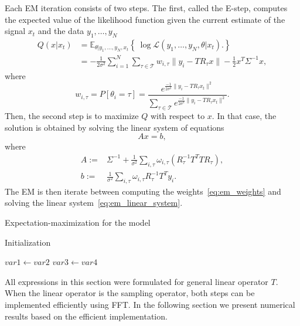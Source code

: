 \documentclass[english,12pt]{article}
\newcommand{\E}{\mathbb{E}}
\numberwithin{equation}{section}
\numberwithin{thm}{section} %
\begin{document}
Each EM iteration consists of two steps.
The first, called the E-step, computes the expected value of the likelihood function  given the current estimate of the signal $x_t$ and the data $y_1,\ldots,y_N$
\begin{equation}
\begin{split}
Q(x|x_t) &= \E_{\theta|y_1,\ldots,y_N,x_t}\left\{\ \log \mathcal{L}(y_1,\ldots,y_N,\theta|x_t).   \right\} \\
& = -\frac{1}{2\sigma^2}\sum_{i=1}^{N}\sum_{\tau\in\mathcal{T}}w_{i,\tau}\|y_i - TR_{\tau}x\| - \frac{1}{2}x^T\Sigma^{-1}x,
\end{split}
\end{equation} 
where 
\begin{equation} \label{eq:em_weights}
w_{i,\tau} = P[\theta_i = \tau] = \frac{e^{\frac{-1}{2\sigma^2}\|y_i-TR_\tau x_t\|^2 }}{\sum_{\tau\in\mathcal{T}}e^{\frac{-1}{2\sigma^2}\|y_i-TR_\tau x_t\|^2 }}.
\end{equation}
Then,  the second step is to maximize $Q$ with respect to $x$. In that case, the solution is obtained by solving the linear system of equations
\begin{equation} \label{eq:em_linear_system}
Ax = b,
\end{equation}
where 
\begin{align}
A :=&  \Sigma^{-1} + \frac{1}{\sigma^2}\sum_{i,\tau}\omega_{i,\tau} (R_\tau^{-1}T^TTR_\tau),\\ 
b :=&   \frac{1}{\sigma^2} \sum_{i,\tau}\omega_{i,\tau}R_\tau^{-1}T^Ty_i.
\end{align}
The EM is then iterate between computing the weights~\eqref{eq:em_weights} and solving the linear system~\eqref{eq:em_linear_system}. 

\begin{algorithm}
	\caption{Expectation-maximization for the model}
	\begin{algorithmic}[1]
		
		\State Initialization 
	
		  
		\State $var1 \leftarrow var2$  
		\State $var3 \leftarrow var4$
		\EndWhile  \label{roy's loop}
		
	\end{algorithmic}
\end{algorithm}


All expressions in this section were formulated for general linear operator $T$. When the linear operator is the sampling operator, both steps can be implemented efficiently using FFT. In the following section we present numerical results based on the efficient implementation. 
\end{document}
